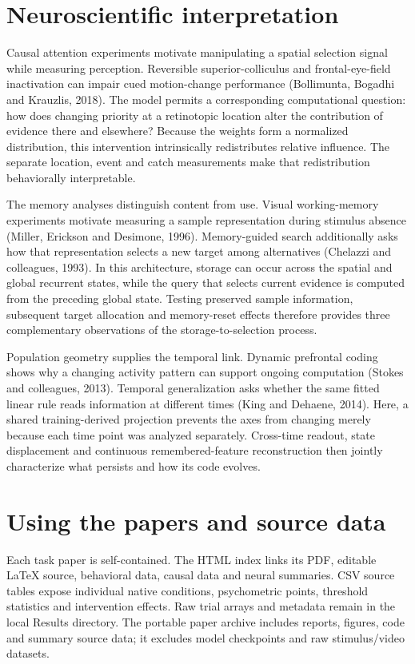 \documentclass[11pt]{article}
\begin{document}
\section{Neuroscientific interpretation}
Causal attention experiments motivate manipulating a spatial selection signal while measuring perception. Reversible superior-colliculus and frontal-eye-field inactivation can impair cued motion-change performance (Bollimunta, Bogadhi and Krauzlis, 2018). The model permits a corresponding computational question: how does changing priority at a retinotopic location alter the contribution of evidence there and elsewhere? Because the weights form a normalized distribution, this intervention intrinsically redistributes relative influence. The separate location, event and catch measurements make that redistribution behaviorally interpretable.

The memory analyses distinguish content from use. Visual working-memory experiments motivate measuring a sample representation during stimulus absence (Miller, Erickson and Desimone, 1996). Memory-guided search additionally asks how that representation selects a new target among alternatives (Chelazzi and colleagues, 1993). In this architecture, storage can occur across the spatial and global recurrent states, while the query that selects current evidence is computed from the preceding global state. Testing preserved sample information, subsequent target allocation and memory-reset effects therefore provides three complementary observations of the storage-to-selection process.

Population geometry supplies the temporal link. Dynamic prefrontal coding shows why a changing activity pattern can support ongoing computation (Stokes and colleagues, 2013). Temporal generalization asks whether the same fitted linear rule reads information at different times (King and Dehaene, 2014). Here, a shared training-derived projection prevents the axes from changing merely because each time point was analyzed separately. Cross-time readout, state displacement and continuous remembered-feature reconstruction then jointly characterize what persists and how its code evolves.

\section{Using the papers and source data}
Each task paper is self-contained. The HTML index links its PDF, editable LaTeX source, behavioral data, causal data and neural summaries. CSV source tables expose individual native conditions, psychometric points, threshold statistics and intervention effects. Raw trial arrays and metadata remain in the local Results directory. The portable paper archive includes reports, figures, code and summary source data; it excludes model checkpoints and raw stimulus/video datasets.
\end{document}
